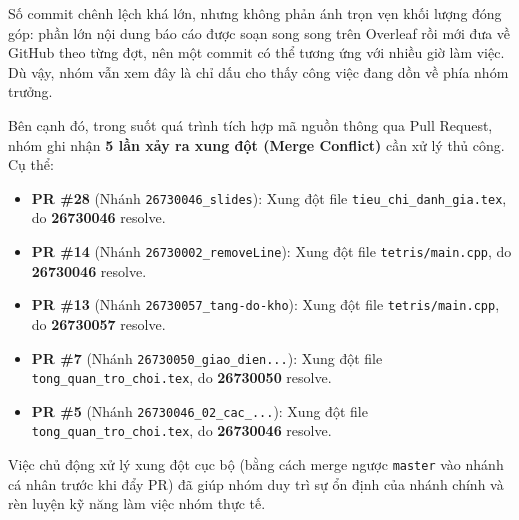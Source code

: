 Số commit chênh lệch khá lớn, nhưng không phản ánh trọn vẹn khối lượng đóng góp: phần lớn nội dung báo cáo được soạn song song trên Overleaf rồi mới đưa về GitHub theo từng đợt, nên một commit có thể tương ứng với nhiều giờ làm việc. Dù vậy, nhóm vẫn xem đây là chỉ dấu cho thấy công việc đang dồn về phía nhóm trưởng.

Bên cạnh đó, trong suốt quá trình tích hợp mã nguồn thông qua Pull Request, nhóm ghi nhận \textbf{5 lần xảy ra xung đột (Merge Conflict)} cần xử lý thủ công. Cụ thể:
\begin{itemize}
    \item \textbf{PR \#28} (Nhánh \texttt{26730046\_slides}): Xung đột file \texttt{tieu\_chi\_danh\_gia.tex}, do \textbf{26730046} resolve.
    \item \textbf{PR \#14} (Nhánh \texttt{26730002\_removeLine}): Xung đột file \texttt{tetris/main.cpp}, do \textbf{26730046} resolve.
    \item \textbf{PR \#13} (Nhánh \texttt{26730057\_tang-do-kho}): Xung đột file \texttt{tetris/main.cpp}, do \textbf{26730057} resolve.
    \item \textbf{PR \#7} (Nhánh \texttt{26730050\_giao\_dien...}): Xung đột file \texttt{tong\_quan\_tro\_choi.tex}, do \textbf{26730050} resolve.
    \item \textbf{PR \#5} (Nhánh \texttt{26730046\_02\_cac\_...}): Xung đột file \texttt{tong\_quan\_tro\_choi.tex}, do \textbf{26730046} resolve.
\end{itemize}
Việc chủ động xử lý xung đột cục bộ (bằng cách merge ngược \texttt{master} vào nhánh cá nhân trước khi đẩy PR) đã giúp nhóm duy trì sự ổn định của nhánh chính và rèn luyện kỹ năng làm việc nhóm thực tế.
